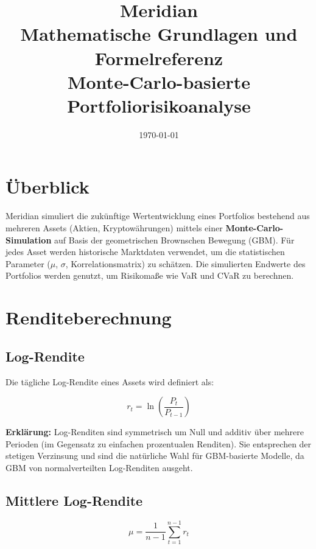 \documentclass[12pt, a4paper]{article}
\title{
    \textbf{Meridian} \\[0.5em]
    \large Mathematische Grundlagen und Formelreferenz \\[0.3em]
    \normalsize Monte-Carlo-basierte Portfoliorisikoanalyse
}
\author{}
\date{\today}
\begin{document}
\maketitle
\tableofcontents
\newpage

\section{Überblick}

Meridian simuliert die zukünftige Wertentwicklung eines Portfolios bestehend aus
mehreren Assets (Aktien, Kryptowährungen) mittels einer \textbf{Monte-Carlo-Simulation}
auf Basis der geometrischen Brownschen Bewegung (GBM). Für jedes Asset werden
historische Marktdaten verwendet, um die statistischen Parameter ($\mu$, $\sigma$,
Korrelationsmatrix) zu schätzen. Die simulierten Endwerte des Portfolios werden
genutzt, um Risikomaße wie VaR und CVaR zu berechnen.

\section{Renditeberechnung}

\subsection{Log-Rendite}

Die tägliche Log-Rendite eines Assets wird definiert als:

\begin{equation}
    r_t = \ln\!\left(\frac{P_t}{P_{t-1}}\right)
\end{equation}

\textbf{Erklärung:} Log-Renditen sind symmetrisch um Null und additiv über
mehrere Perioden (im Gegensatz zu einfachen prozentualen Renditen). Sie
entsprechen der stetigen Verzinsung und sind die natürliche Wahl für GBM-basierte
Modelle, da GBM von normalverteilten Log-Renditen ausgeht.

\subsection{Mittlere Log-Rendite}

\begin{equation}
    \mu = \frac{1}{n-1} \sum_{t=1}^{n-1} r_t
\end{equation}
\end{document}
